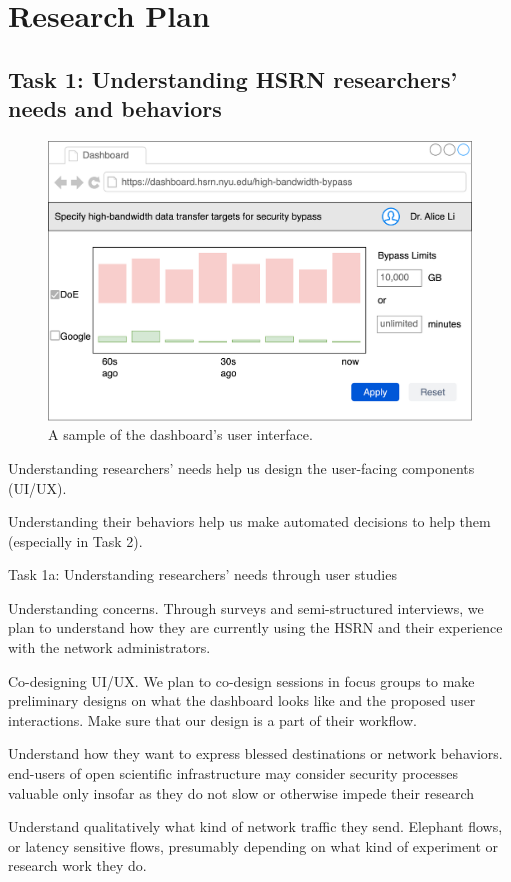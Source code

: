 \section{Research Plan}

\subsection{Task 1: Understanding HSRN researchers’ needs and behaviors}

\begin{figure}[t]
    \centering
    \includegraphics[width=0.5\linewidth]{figures/dashboard.png}
    \caption{A sample of the dashboard's user interface.}
    \label{fig:dashboard}
\end{figure}


Understanding researchers’ needs help us design the user-facing components (UI/UX).

Understanding their behaviors help us make automated decisions to help them (especially in Task 2).

Task 1a: Understanding researchers’ needs through user studies

Understanding concerns. Through surveys and semi-structured interviews, we plan to understand how they are currently using the HSRN and their experience with the network administrators.

Co-designing UI/UX. We plan to co-design sessions in focus groups to make preliminary designs on what the dashboard looks like and the proposed user interactions. Make sure that our design is a part of their workflow.

Understand how they want to express blessed destinations or network behaviors. end-users of open scientific infrastructure may consider security processes valuable only insofar as they do not slow or otherwise impede their research

Understand qualitatively what kind of network traffic they send. Elephant flows, or latency sensitive flows, presumably depending on what kind of experiment or research work they do.

